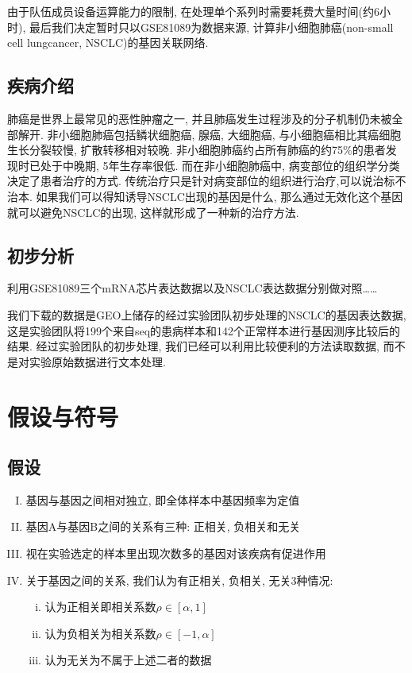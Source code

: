 \documentclass[zihao=-4]{ctexart}
\begin{document}
由于队伍成员设备运算能力的限制, 在处理单个系列时需要耗费大量时间(约6小时), 最后我们决定暂时只以GSE81089为数据来源, 计算非小细胞肺癌(non-small cell lungcancer, NSCLC)的基因关联网络.
\subsection{疾病介绍}
肺癌是世界上最常见的恶性肿瘤之一, 并且肺癌发生过程涉及的分子机制仍未被全部解开. 非小细胞肺癌包括鳞状细胞癌, 腺癌, 大细胞癌, 与小细胞癌相比其癌细胞生长分裂较慢, 扩散转移相对较晚. 非小细胞肺癌约占所有肺癌的约75\%的患者发现时已处于中晚期, 5年生存率很低. 而在非小细胞肺癌中, 病变部位的组织学分类决定了患者治疗的方式. 传统治疗只是针对病变部位的组织进行治疗,可以说治标不治本. 如果我们可以得知诱导NSCLC出现的基因是什么, 那么通过无效化这个基因就可以避免NSCLC的出现, 这样就形成了一种新的治疗方法.
\subsection{初步分析}
利用GSE81089三个mRNA芯片表达数据以及NSCLC表达数据分别做对照……

我们下载的数据是GEO上储存的经过实验团队初步处理的NSCLC的基因表达数据, 这是实验团队将199个来自seq的患病样本和142个正常样本进行基因测序比较后的结果. 经过实验团队的初步处理, 我们已经可以利用比较便利的方法读取数据, 而不是对实验原始数据进行文本处理. 



\section{假设与符号}
\subsection{假设}

\begin{enumerate}[I.]
    \item 基因与基因之间相对独立, 即全体样本中基因频率为定值
    \item 基因A与基因B之间的关系有三种: 正相关, 负相关和无关
    \item 视在实验选定的样本里出现次数多的基因对该疾病有促进作用
    \item 关于基因之间的关系, 我们认为有正相关, 负相关, 无关3种情况:
    \begin{enumerate}[i.]
        \item 认为正相关即相关系数$\rho \in [\alpha, 1]$
        \item 认为负相关为相关系数$\rho \in [-1,\alpha]$
        \item 认为无关为不属于上述二者的数据
    \end{enumerate}
\end{enumerate}
\end{document}
